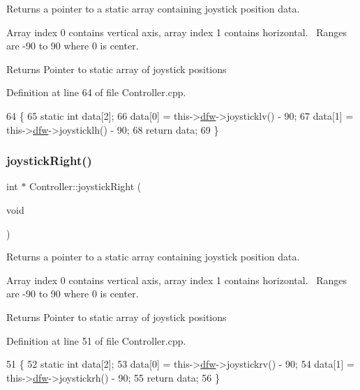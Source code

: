 Returns a pointer to a static array containing joystick position data. 

Array index 0 contains vertical axis, array index 1 contains horizontal.~\newline
 Ranges are -\/90 to 90 where 0 is center. \begin{DoxyReturn}{Returns}
Pointer to static array of joystick positions 
\end{DoxyReturn}


Definition at line 64 of file Controller.\+cpp.


\begin{DoxyCode}
64                                   \{
65     \textcolor{keyword}{static} \textcolor{keywordtype}{int} data[2];
66     data[0] = this->\hyperlink{class_controller_af4793ccbf2ecdbfcdb9359bd32b6e8cf}{dfw}->joysticklv() - 90;
67     data[1] = this->\hyperlink{class_controller_af4793ccbf2ecdbfcdb9359bd32b6e8cf}{dfw}->joysticklh() - 90;
68     \textcolor{keywordflow}{return} data;
69 \}
\end{DoxyCode}
\mbox{\label{class_controller_a99b39f4782ef2164dc3d3d1b512330bd}} 
\subsubsection{\texorpdfstring{joystick\+Right()}{joystickRight()}}
{\footnotesize\ttfamily int $\ast$ Controller\+::joystick\+Right (\begin{DoxyParamCaption}\item[{void}]{ }\end{DoxyParamCaption})}



Returns a pointer to a static array containing joystick position data. 

Array index 0 contains vertical axis, array index 1 contains horizontal.~\newline
 Ranges are -\/90 to 90 where 0 is center. \begin{DoxyReturn}{Returns}
Pointer to static array of joystick positions 
\end{DoxyReturn}


Definition at line 51 of file Controller.\+cpp.


\begin{DoxyCode}
51                                    \{
52     \textcolor{keyword}{static} \textcolor{keywordtype}{int} data[2];
53     data[0] = this->\hyperlink{class_controller_af4793ccbf2ecdbfcdb9359bd32b6e8cf}{dfw}->joystickrv() - 90;
54     data[1] = this->\hyperlink{class_controller_af4793ccbf2ecdbfcdb9359bd32b6e8cf}{dfw}->joystickrh() - 90;
55     \textcolor{keywordflow}{return} data;
56 \}
\end{DoxyCode}
\mbox{\label{class_controller_a366ce47c27b1a02e9e1b2ad5840e78df}} 
